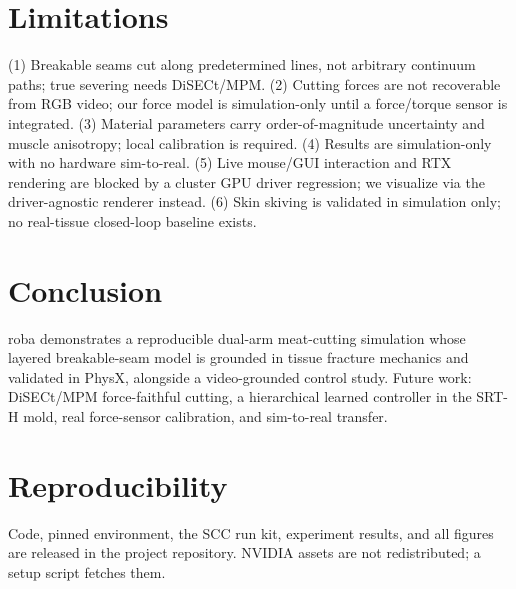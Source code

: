 \documentclass[conference]{IEEEtran}
\begin{document}
\section{Limitations}
\label{sec:limits}
(1) Breakable seams cut along predetermined lines, not arbitrary continuum paths; true severing needs
DiSECt/MPM. (2) Cutting forces are not recoverable from RGB video; our force model is simulation-only
until a force/torque sensor is integrated. (3) Material parameters carry order-of-magnitude
uncertainty and muscle anisotropy; local calibration is required. (4) Results are simulation-only with
no hardware sim-to-real. (5) Live mouse/GUI interaction and RTX rendering are blocked by a cluster GPU
driver regression; we visualize via the driver-agnostic renderer instead. (6) Skin skiving is validated
in simulation only; no real-tissue closed-loop baseline exists.

\section{Conclusion}
\label{sec:conclusion}
roba demonstrates a reproducible dual-arm meat-cutting simulation whose layered breakable-seam model is
grounded in tissue fracture mechanics and validated in PhysX, alongside a video-grounded control study.
Future work: DiSECt/MPM force-faithful cutting, a hierarchical learned controller in the SRT-H mold,
real force-sensor calibration, and sim-to-real transfer.

\section*{Reproducibility}
Code, pinned environment, the SCC run kit, experiment results, and all figures are released in the
project repository. NVIDIA assets are not redistributed; a setup script fetches them.
\end{document}
